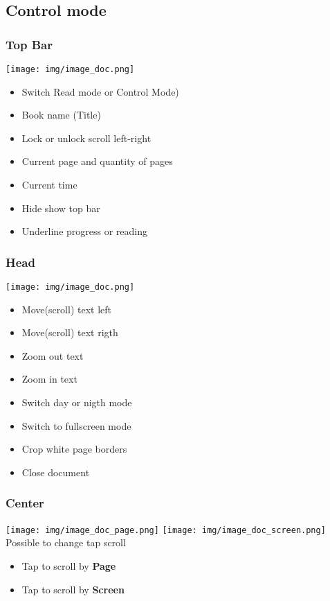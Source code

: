 \documentclass[14pt,letter]{article}
\begin{document}
\newpage
\subsection{Control mode}

\subsubsection{Top Bar}
\texttt{[image: img/image\_doc.png]}
\begin{itemize}
  \item Switch Read mode or Control Mode)
  \item Book name (Title)
  \item Lock or unlock scroll left-right
  \item Current page and quantity of pages
  \item Current time
  \item Hide show top bar
  \item Underline progress or reading
\end{itemize}


\subsubsection{Head}


\texttt{[image: img/image\_doc.png]}
\begin{itemize}
  \item Move(scroll) text left
  \item Move(scroll) text rigth
  \item Zoom out text
  \item Zoom in text
  \item Switch day or nigth mode
  \item Switch to fullscreen mode
  \item Crop white page borders
  \item Close document
\end{itemize}

\subsubsection{Center}
\texttt{[image: img/image\_doc\_page.png]}
\texttt{[image: img/image\_doc\_screen.png]}\\
Possible to change tap scroll
\begin{itemize}
  \item Tap to scroll by \textbf{Page}
  \item Tap to scroll by \textbf{Screen}
\end{itemize}
\end{document}
